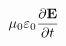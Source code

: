 \documentclass[preview]{standalone}
\begin{document}
\begin{align*}
\mu_{0}\varepsilon_{0} \pdv{\mathbf{E}}{t}
\end{align*}
\end{document}

